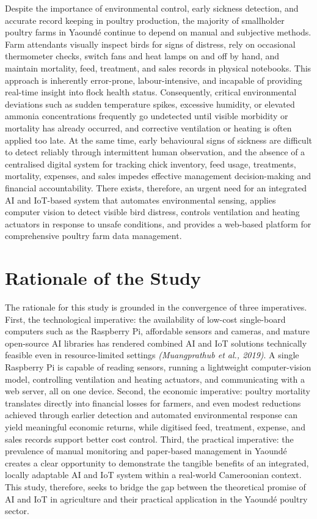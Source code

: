 \documentclass[12pt,a4paper]{report}
\begin{document}
Despite the importance of environmental control, early sickness detection, and accurate record keeping in poultry production, the majority of smallholder poultry farms in Yaound\'e continue to depend on manual and subjective methods. Farm attendants visually inspect birds for signs of distress, rely on occasional thermometer checks, switch fans and heat lamps on and off by hand, and maintain mortality, feed, treatment, and sales records in physical notebooks. This approach is inherently error-prone, labour-intensive, and incapable of providing real-time insight into flock health status. Consequently, critical environmental deviations such as sudden temperature spikes, excessive humidity, or elevated ammonia concentrations frequently go undetected until visible morbidity or mortality has already occurred, and corrective ventilation or heating is often applied too late. At the same time, early behavioural signs of sickness are difficult to detect reliably through intermittent human observation, and the absence of a centralised digital system for tracking chick inventory, feed usage, treatments, mortality, expenses, and sales impedes effective management decision-making and financial accountability. There exists, therefore, an urgent need for an integrated AI and IoT-based system that automates environmental sensing, applies computer vision to detect visible bird distress, controls ventilation and heating actuators in response to unsafe conditions, and provides a web-based platform for comprehensive poultry farm data management.

\section{Rationale of the Study}

The rationale for this study is grounded in the convergence of three imperatives. First, the technological imperative: the availability of low-cost single-board computers such as the Raspberry Pi, affordable sensors and cameras, and mature open-source AI libraries has rendered combined AI and IoT solutions technically feasible even in resource-limited settings \textit{(Muangprathub et al., 2019)}. A single Raspberry Pi is capable of reading sensors, running a lightweight computer-vision model, controlling ventilation and heating actuators, and communicating with a web server, all on one device. Second, the economic imperative: poultry mortality translates directly into financial losses for farmers, and even modest reductions achieved through earlier detection and automated environmental response can yield meaningful economic returns, while digitised feed, treatment, expense, and sales records support better cost control. Third, the practical imperative: the prevalence of manual monitoring and paper-based management in Yaound\'e creates a clear opportunity to demonstrate the tangible benefits of an integrated, locally adaptable AI and IoT system within a real-world Cameroonian context. This study, therefore, seeks to bridge the gap between the theoretical promise of AI and IoT in agriculture and their practical application in the Yaound\'e poultry sector.
\end{document}
